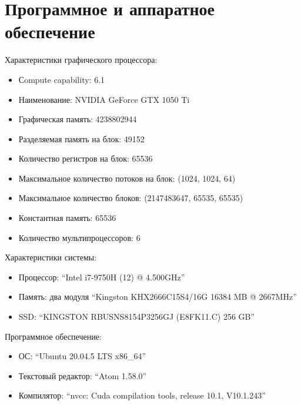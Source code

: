 \section{Программное и аппаратное обеспечение}
Характеристики графического процессора:
\begin{itemize}[noitemsep, topsep=0pt]
	\item Сompute capability: 6.1
    \item Наименование: NVIDIA GeForce GTX 1050 Ti
    \item Графическая память: 4238802944
	\item Разделяемая память на блок: 49152
	\item Количество регистров на блок: 65536
	\item Максимальное количество потоков на блок: (1024, 1024, 64)
	\item Максимальное количество блоков: (2147483647, 65535, 65535)
	\item Константная память: 65536
	\item Количество мультипроцессоров: 6
\end{itemize}

Характеристики системы:
\begin{itemize}[noitemsep, topsep=0pt]
	\item Процессор: \enquote{Intel i7-9750H (12) @ 4.500GHz}
	\item Память: два модуля \enquote{Kingston KHX2666C15S4/16G 16384 MB @ 2667MHz}
	\item SSD: \enquote{KINGSTON RBUSNS8154P3256GJ (E8FK11.C) 256 GB}
\end{itemize}

Программное обеспечение:
\begin{itemize}[noitemsep, topsep=0pt]
	\item ОС: \enquote{Ubuntu 20.04.5 LTS x86\_64}
	\item Текстовый редактор: \enquote{Atom 1.58.0}
	\item Компилятор: \enquote{nvcc: Cuda compilation tools, release 10.1, V10.1.243}
\end{itemize}

\pagebreak
